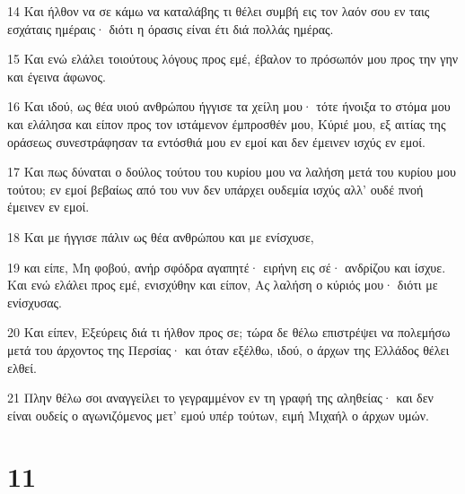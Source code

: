 \par 14 Και ήλθον να σε κάμω να καταλάβης τι θέλει συμβή εις τον λαόν σου εν ταις εσχάταις ημέραις· διότι η όρασις είναι έτι διά πολλάς ημέρας.
\par 15 Και ενώ ελάλει τοιούτους λόγους προς εμέ, έβαλον το πρόσωπόν μου προς την γην και έγεινα άφωνος.
\par 16 Και ιδού, ως θέα υιού ανθρώπου ήγγισε τα χείλη μου· τότε ήνοιξα το στόμα μου και ελάλησα και είπον προς τον ιστάμενον έμπροσθέν μου, Κύριέ μου, εξ αιτίας της οράσεως συνεστράφησαν τα εντόσθιά μου εν εμοί και δεν έμεινεν ισχύς εν εμοί.
\par 17 Και πως δύναται ο δούλος τούτου του κυρίου μου να λαλήση μετά του κυρίου μου τούτου; εν εμοί βεβαίως από του νυν δεν υπάρχει ουδεμία ισχύς αλλ' ουδέ πνοή έμεινεν εν εμοί.
\par 18 Και με ήγγισε πάλιν ως θέα ανθρώπου και με ενίσχυσε,
\par 19 και είπε, Μη φοβού, ανήρ σφόδρα αγαπητέ· ειρήνη εις σέ· ανδρίζου και ίσχυε. Και ενώ ελάλει προς εμέ, ενισχύθην και είπον, Ας λαλήση ο κύριός μου· διότι με ενίσχυσας.
\par 20 Και είπεν, Εξεύρεις διά τι ήλθον προς σε; τώρα δε θέλω επιστρέψει να πολεμήσω μετά του άρχοντος της Περσίας· και όταν εξέλθω, ιδού, ο άρχων της Ελλάδος θέλει ελθεί.
\par 21 Πλην θέλω σοι αναγγείλει το γεγραμμένον εν τη γραφή της αληθείας· και δεν είναι ουδείς ο αγωνιζόμενος μετ' εμού υπέρ τούτων, ειμή Μιχαήλ ο άρχων υμών.

\chapter{11}

